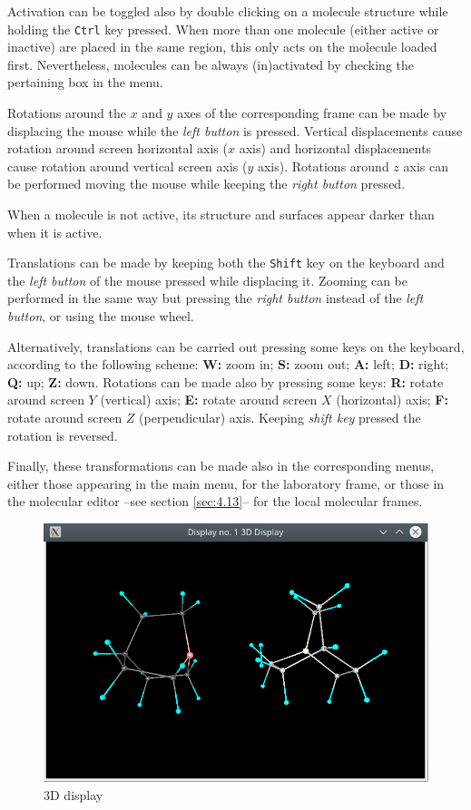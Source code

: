 \documentclass[10pt]{article}
\begin{document}
Activation can be toggled also by double clicking on a molecule structure 
while holding the \texttt{Ctrl} key pressed. When more than one molecule (either active or inactive) are placed in 
the same region, this only acts on the molecule loaded first. Nevertheless, molecules can be always (in)activated 
by checking the pertaining box in the menu.

Rotations
around the $x$ and $y$ axes of the corresponding frame can be made by displacing 
the mouse while the {\it left button} is pressed. 
Vertical displacements cause rotation around screen horizontal axis ($x$ axis) and horizontal
displacements cause rotation around vertical screen axis ($y$ axis). Rotations around $z$ axis
can be performed moving the mouse while keeping the {\it right button} pressed.

When a molecule is not active, its structure and surfaces appear darker than when it is active.

Translations can be made by keeping both the \texttt{Shift} key 
on the keyboard and the {\it left button} of the mouse pressed
while displacing it. Zooming can be performed in the same way but pressing 
the {\it right button} instead of the {\it left button}, or using the mouse wheel.

Alternatively, translations can be carried out pressing some keys on the keyboard, according to 
the following scheme: {\bf W:} zoom in; {\bf S:} zoom out; {\bf A:} left; {\bf D:} right;
{\bf Q:} up; {\bf Z:} down. Rotations can be made
also by pressing some keys: {\bf R:} rotate around screen $Y$ (vertical) axis; 
{\bf E:} rotate around screen $X$ (horizontal) axis; {\bf F:} rotate around screen $Z$ (perpendicular) axis.
Keeping {\it shift key} pressed the rotation is reversed.

Finally, these transformations can be made also in the corresponding menus, 
either those appearing in the main menu, for
the laboratory frame, or those in the molecular editor --see section \ref{sec:4.13}-- for the local molecular frames.

\begin{figure}[H]
\begin{center}
\includegraphics[width=0.5\linewidth]{damqt320_3D_display.png}
\end{center}
\caption{{3D display}\label{fig:4_1_2}}
\end{figure}
\end{document}
